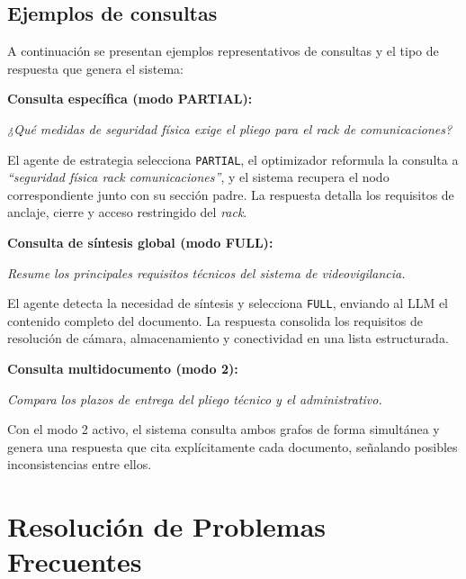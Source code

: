 \subsection{Ejemplos de consultas}

A continuación se presentan ejemplos representativos de consultas y el tipo de respuesta que genera el sistema:

\textbf{Consulta específica (modo PARTIAL):}

\medskip\noindent\textit{¿Qué medidas de seguridad física exige el pliego para el rack de comunicaciones?}

El agente de estrategia selecciona \texttt{PARTIAL}, el optimizador reformula la consulta a \textit{``seguridad física rack comunicaciones''}, y el sistema recupera el nodo correspondiente junto con su sección padre. La respuesta detalla los requisitos de anclaje, cierre y acceso restringido del \textit{rack}.

\textbf{Consulta de síntesis global (modo FULL):}

\medskip\noindent\textit{Resume los principales requisitos técnicos del sistema de videovigilancia.}

El agente detecta la necesidad de síntesis y selecciona \texttt{FULL}, enviando al LLM el contenido completo del documento. La respuesta consolida los requisitos de resolución de cámara, almacenamiento y conectividad en una lista estructurada.

\textbf{Consulta multidocumento (modo 2):}

\medskip\noindent\textit{Compara los plazos de entrega del pliego técnico y el administrativo.}

Con el modo 2 activo, el sistema consulta ambos grafos de forma simultánea y genera una respuesta que cita explícitamente cada documento, señalando posibles inconsistencias entre ellos.

\section{Resolución de Problemas Frecuentes}

